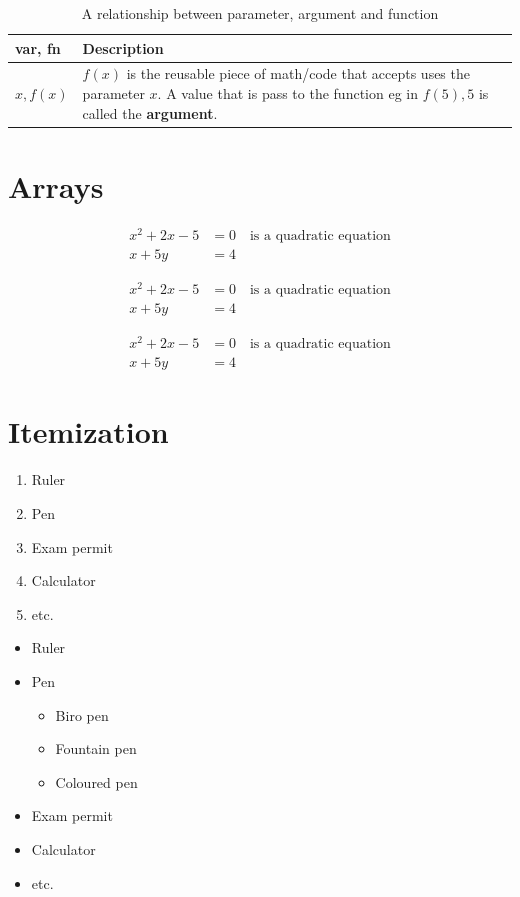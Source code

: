 \documentclass[14pt]{article}
\begin{document}
	\begin{table}
		\centering		
		
		\caption{A relationship between parameter, argument and function}
		\def \arraystretch{1.25}
		
		\begin{tabular}{|l|p{5cm}|}
		\hline
		var, fn & Description \\ 
		\hline
		$x,f(x)$ & $f(x)$ is the reusable piece of math/code that accepts uses the parameter $x$. A value that is pass to the function eg in $f(5), 5$ is called the \textbf{argument}.\\
		\hline
		
		\end{tabular}
	\end{table}
	
	\section{Arrays}
	
	\begin{align}
		x^2 + 2x -5 &= 0\quad \text{is a quadratic equation}\\
		x+5y&=4
	\end{align}
	
	
	\begin{align*}
		x^2 + 2x -5 &= 0\quad \text{is a quadratic equation}\\
		x+5y&=4
	\end{align*}
	
	
	\begin{align}
		x^2 + 2x -5 &= 0\quad \text{is a quadratic equation}\\
		x+5y&=4
	\end{align}
	
	\section{Itemization}
	
	\begin{enumerate}
		\item Ruler
		\item Pen
		\item Exam permit
		\item Calculator
		\item etc.
	\end{enumerate}
	
	
	\begin{itemize}
		\item Ruler
		\item Pen
			\begin{itemize}
				\item[$\times$] Biro pen
				\item[$\checkmark$] Fountain pen
				\item[$\times$] Coloured pen
			\end{itemize}
		\item Exam permit
		\item Calculator
		\item etc.
	\end{itemize}
	
\end{document}
